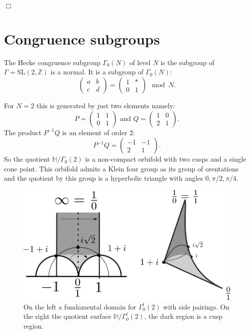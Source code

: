 \documentclass[12pt,a4paper]{amsart}
\def\HH{\mathbb{H}}
\def\oo{\HH / \Gamma_0(2)}
\def\ah{\Gamma_0^t(2)}
\def\oot{\HH / \ah}
\def\ZZ{\mathbb{Z}}
\begin{document}
\hfill $\Box$

\section{Congruence subgroups}

The Hecke congruence subgroup $\Gamma_0(N)$ of level $N$ is the subgroup of
$\Gamma = \mathrm{SL}(2,\ZZ)$ is a normal.
It is a subgroup of $\Gamma_0(N)$:
$$ \begin{pmatrix} a & b \\ c & d \end{pmatrix} = 
\begin{pmatrix} 1 & * \\ 0 & 1 \end{pmatrix} \mod N.$$

For $N=2$ this is generated by just two elements namely:
$$ P = \begin{pmatrix} 1 & 1 \\ 0 & 1 \end{pmatrix} \text{ and } Q=  \begin{pmatrix} 1 & 0 \\ 2 & 1 \end{pmatrix}.$$
The product $P^{-1}Q$ is an element of order $2$:
$$ P^{-1}Q = \begin{pmatrix} -1 & -1 \\ 2 & 1 \end{pmatrix}.$$
So the quotient $\oo$ is a non-compact orbifold with two cusps and a single cone point.
This orbifold admits a Klein four group as its group of orentations
and the quotient by this group is a hyperbolic triangle with angles
$0, \pi/2, \pi/4$.

 \begin{figure}[H]
\begin{center}
\includegraphics[scale=.5]{hecke_fund_dom.png} 
\end{center}
\caption{On the left a fundamental domain for $\ah$ with side
pairings.  On the right the quotient surface $\oot$, the dark region
is a cusp region.}
\label{fundamental domain}
\end{figure}
\end{document}
